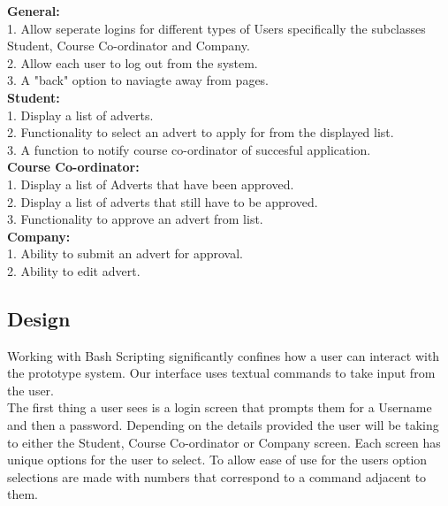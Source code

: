 \documentclass{l3deliverable}
\begin{document}
\textbf{General:}\\

1. Allow seperate logins for different types of Users specifically the subclasses Student, Course Co-ordinator and Company.\\
2. Allow each user to log out from the system. \\
3. A "back" option to naviagte away from pages.\\

\textbf{Student:}\\

1. Display a list of adverts.\\
2. Functionality to select an advert to apply for from the displayed list.\\
3. A function to notify course co-ordinator of succesful application.\\

\textbf{Course Co-ordinator:}\\

1. Display a list of Adverts that have been approved.\\
2. Display a list of adverts that still have to be approved.\\
3. Functionality to approve an advert from list.\\
 
\textbf{Company:}\\

1. Ability to submit an advert for approval.\\
2. Ability to edit advert.\\

\subsection{Design}

Working with Bash Scripting significantly confines how a user can interact with the prototype system. Our interface uses textual commands to take input from the user. \\

The first thing a user sees is a login screen that prompts them for a Username and then a password. Depending on the details provided the user will be taking to either the Student, Course Co-ordinator or Company screen. Each screen has unique options for the user to select. To allow ease of use for the users option selections are made with numbers that correspond to a command adjacent to them.  
\end{document}

